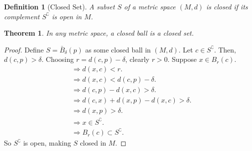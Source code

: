 \documentclass{article}
\newtheorem{definition}{Definition}[section]
\newtheorem{theorem}{Theorem}[section]
\begin{document}
			\begin{definition}[Closed Set]
				\label{closed set}
				A subset $S$ of a metric space $(M, d)$ is closed if its complement $S^\complement$ is open in $M$.
			\end{definition}

			\begin{theorem}
				In any metric space, a closed ball is a closed set.
			\end{theorem}
			\begin{proof} 
				Define $S = \bar{B}_{\delta}(p)$ as some closed ball in $(M, d)$.
				Let $c \in S^\complement$.
				Then, $d(c, p) > \delta$.
				Choosing $r = d(c, p) - \delta$, clearly $r > 0$.
				Suppose $x \in B_{r}(c)$.
				\begin{align*}
					&\Rightarrow d(x, c) < r. \\
					&\Rightarrow d(x, c) < d(c, p) - \delta. \\
					&\Rightarrow d(c, p) - d(x, c) > \delta. \\
					&\Rightarrow d(c, x) + d(x, p) - d(x, c) > \delta. \\
					&\Rightarrow d(x, p) > \delta. \\
					&\Rightarrow x \in S^\complement. \\
					&\Rightarrow B_{r}(c) \subset S^\complement.
				\end{align*}
				So $S^\complement$ is open, making $S$ closed in $M$.
			\end{proof}
\end{document}
